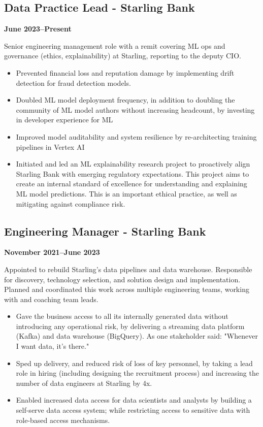 \documentclass[a4paper]{scrartcl}
\begin{document}
\subsection*{Data Practice Lead - Starling Bank}
\textbf{June 2023--Present}

Senior engineering management role with a remit covering ML ops and governance (ethics,
explainability) at Starling, reporting to the deputy CIO.
\begin{itemize}
	\item Prevented financial loss and reputation damage by implementing
	      drift detection for fraud detection models.
	\item Doubled ML model deployment frequency, in addition to doubling the community of ML model authors without increasing headcount, by investing in developer experience for ML
	\item Improved model auditability and system resilience by re-architecting training pipelines in Vertex AI
	\item Initiated and led an ML explainability research project to proactively align Starling Bank with emerging regulatory expectations. This project aims to create an internal standard of excellence for understanding and explaining ML model predictions. This is an important ethical practice, as well as mitigating against compliance risk.
\end{itemize}

\subsection*{Engineering Manager - Starling Bank}
\textbf{November 2021--June 2023}

Appointed to rebuild Starling's data pipelines and data warehouse. Responsible for discovery, technology selection, and solution design and implementation. Planned and coordinated this work across multiple engineering teams, working with and coaching team leads.
\begin{itemize}
	\item Gave the business access to all its internally generated data without introducing any operational risk, by delivering a streaming data platform (Kafka) and data warehouse (BigQuery). As one stakeholder said: "Whenever I want data, it's there."
	\item Sped up delivery, and reduced risk of loss of key personnel, by taking a lead role in hiring (including designing the recruitment process) and increasing the number of data engineers at Starling by 4x.
	\item Enabled increased data access for data scientists and analysts by building a self-serve data access system; while restricting access to sensitive data with role-based access mechanisms.
\end{itemize}
\end{document}
